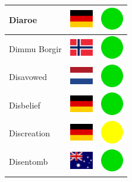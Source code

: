 \documentclass[12pt, a4paper, twoside]{report}
\begin{document}
\begin{center}
\begin{longtable}{|p{5cm}|p{2cm}|p{2cm}|}
 Diaroe                                                     & \includegraphics[width=1cm]{../4x3/de} &   \includegraphics[width=1cm]{../likes/y} \\ \hline
 Dimmu Borgir                                               & \includegraphics[width=1cm]{../4x3/no} &   \includegraphics[width=1cm]{../likes/y} \\ \hline
 Disavowed                                                  & \includegraphics[width=1cm]{../4x3/nl} &   \includegraphics[width=1cm]{../likes/y} \\ \hline
 Disbelief                                                  & \includegraphics[width=1cm]{../4x3/de} &   \includegraphics[width=1cm]{../likes/y} \\ \hline
 Discreation                                                & \includegraphics[width=1cm]{../4x3/de} &   \includegraphics[width=1cm]{../likes/m} \\ \hline
 Disentomb                                                  & \includegraphics[width=1cm]{../4x3/au} &   \includegraphics[width=1cm]{../likes/y} \\ \hline

\end{longtable}
\end{center}
\end{document}
